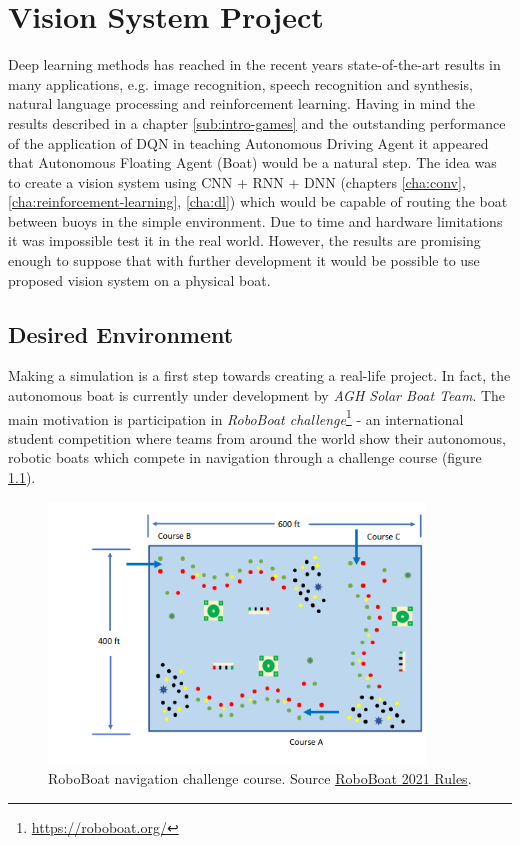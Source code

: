 \chapter{Vision System Project}
\label{cha:vision-system-project}

Deep learning methods has reached in the recent years state-of-the-art results in many applications, e.g. image recognition, speech
recognition and synthesis, natural language processing and reinforcement learning. Having in mind the results described in a chapter
\ref{sub:intro-games} and the outstanding performance of the application of DQN in teaching Autonomous Driving Agent
\cite{2020DuckieTown} it appeared that Autonomous Floating Agent (Boat) would be a natural step. The idea was to create a vision system
using CNN + RNN + DNN (chapters \ref{cha:conv}, \ref{cha:reinforcement-learning}, \ref{cha:dl}) which would be capable of routing the boat
between buoys in the simple environment. Due to time and hardware limitations it was impossible test it in the real world. However, the
results are promising enough to suppose that with further development it would be possible to use proposed vision system on a physical
boat.

\section{Desired Environment}
\label{sec:desired-environment}

Making a simulation is a first step towards creating a real-life project. In fact, the autonomous boat is currently under
development by \emph{AGH Solar Boat Team}. The main motivation is participation in \emph{RoboBoat
challenge}\footnote{\url{https://roboboat.org/}} - an international student competition where teams from around the world show
their autonomous, robotic boats which compete in navigation through a challenge course (figure \ref{fig:roboboat-challenge-course}).

\begin{figure}[h]
    \centering
    \includegraphics[width=10cm]{img/roboboat_course.png}
    \caption{RoboBoat navigation challenge course.
    Source \href{https://robonation.org/app/uploads/sites/3/2021/03/RoboBoat-2021-Rules-and-Task-Description_V1.pdf}{RoboBoat 2021 Rules}.}
    \label{fig:roboboat-challenge-course}
\end{figure}

